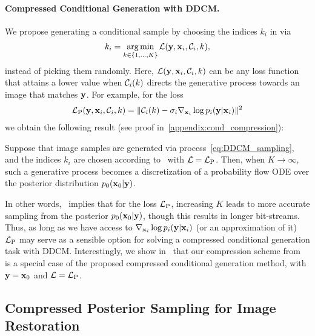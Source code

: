 \paragraph{Compressed Conditional Generation with DDCM.}We propose generating a conditional sample by choosing the indices $k_{i}$ in  via
\begin{align}
k_{i}=\operatorname*{arg\,min}_{k\in\{1,\hdots,K\}}{\mathcal{L}}({\mathbf{y}},{\mathbf{x}}_{i},{\mathcal{C}}_{i},k),\label{eq:k_choose_conditional}
\end{align}
instead of picking them randomly.
Here, ${\mathcal{L}}({\mathbf{y}},{\mathbf{x}}_{i},{\mathcal{C}}_{i},k)$ can be any loss function that attains a lower value when ${\mathcal{C}}_{i}(k)$ 
directs the generative process towards an image that matches ${\mathbf{y}}$.
For example, for the loss
\begin{align}
{\mathcal{L}}_{\text{P}}({\mathbf{y}},{\mathbf{x}}_{i},{\mathcal{C}}_{i},k)=\lVert{\mathcal{C}}_{i}(k)-\sigma_{i}\nabla_{{\mathbf{x}}_{i}}\log{p_{i}({\mathbf{y}}|{\mathbf{x}}_{i})}\rVert^{2}\label{eq:l_score}
\end{align}
we obtain the following result (see proof in~\cref{appendix:cond_compression}):
\begin{proposition}\label{prob:ode_convergence}
Suppose that image samples are generated via process~\cref{eq:DDCM_sampling}, and the indices $k_{i}$ are chosen according to~ with ${\mathcal{L}}={\mathcal{L}}_{\textnormal{P}}$.
Then, when $K\rightarrow\infty$, such a generative process becomes a discretization of a probability flow ODE over the posterior distribution $p_{0}({\mathbf{x}}_{0}|{\mathbf{y}})$.
\end{proposition}
In other words,~ implies that for the loss ${\mathcal{L}}_{\text{P}}$, increasing $K$ leads to more accurate sampling from the posterior $p_{0}({\mathbf{x}}_{0}|{\mathbf{y}})$, though this results in longer bit-streams.
Thus, as long as we have access to $\nabla_{{\mathbf{x}}_{i}}\log{p_{i}({\mathbf{y}}|{\mathbf{x}}_{i})}$ (or an  approximation of it) ${\mathcal{L}}_{\text{P}}$ may serve as a sensible option for solving a compressed conditional generation task with DDCM.
Interestingly, we show in~ that our compression scheme from~ is a special case of the proposed compressed conditional generation method, with ${\mathbf{y}}={\mathbf{x}}_{0}$ and ${\mathcal{L}}={\mathcal{L}}_{\text{P}}$.

\subsection{Compressed Posterior Sampling for Image Restoration}\label{sec:zero-shot-restoration}


